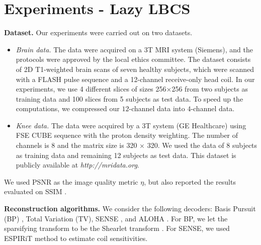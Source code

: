 \section{Experiments - Lazy LBCS}\label{s:exp_llbcs}
\textbf{Dataset.} Our experiments were carried out on two datasets.
\begin{itemize}
    \item \textit{Brain data.} The data were acquired on a 3T MRI system (Siemens), and the protocols were approved by the local ethics committee. The dataset consists of 2D T1-weighted brain scans of seven healthy subjects, which were scanned with a FLASH pulse sequence and a 12-channel receive-only head coil.  In our experiments, we use 4 different slices {of sizes 256$\times$256} from two subjects as training data and 100 slices from 5 subjects as test data. To speed up the computations, we compressed our $12$-channel data into $4$-channel data. 
    \item \textit{Knee data.} The data were acquired by a 3T system (GE Healthcare) using FSE CUBE sequence with the proton density weighting. The number of channels is 8 and the matrix size is 320 $\times$ 320. We used the data of 8 subjects as training data and remaining 12 subjects as test data. This dataset is publicly available at \textit{http://mridata.org}.
\end{itemize}
 We used PSNR as the image quality metric $\eta$, but also reported the results evaluated on SSIM \citep{wang2004image}.


\textbf{Reconstruction algorithms.} We consider the following decoders: Basis Pursuit (BP) \citep{donoho2006compressed}, Total Variation (TV), SENSE \citep{pruessmann1999sense}, and ALOHA \citep{jin2016general}. For BP, we let the sparsifying transform to be the Shearlet transform \citep{kutyniok2016shearlab}. For SENSE, we used ESPIRiT \citep{uecker2014espirit} method to estimate coil sensitivities. 

